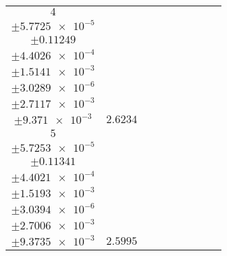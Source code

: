 \documentclass[8pt]{article}
\begin{document}
\begin{longtable}[l]{c c c c c c c c c}
$\num{4}$ & \begin{tabular}[c]{@{}c@{}}$\num{2.9888e-2}$ \\ $\pm\num{5.7725e-5}$\end{tabular} & \begin{tabular}[c]{@{}c@{}}$\num{0.17475}$ \\ $\pm\num{0.11249}$\end{tabular} & \begin{tabular}[c]{@{}c@{}}$\num{-2.9568}$ \\ $\pm\num{4.4026e-4}$\end{tabular} & \begin{tabular}[c]{@{}c@{}}$\num{1.1769e+3}$ \\ $\pm\num{1.5141e-3}$\end{tabular} & \begin{tabular}[c]{@{}c@{}}$\num{2.3544}$ \\ $\pm\num{3.0289e-6}$\end{tabular} & \begin{tabular}[c]{@{}c@{}}$\num{1.1533}$ \\ $\pm\num{2.7117e-3}$\end{tabular} & \begin{tabular}[c]{@{}c@{}}$\num{4.1822}$ \\ $\pm\num{9.371e-3}$\end{tabular} & $\num{2.6234}$\\
$\num{5}$ & \begin{tabular}[c]{@{}c@{}}$\num{2.9531e-2}$ \\ $\pm\num{5.7253e-5}$\end{tabular} & \begin{tabular}[c]{@{}c@{}}$\num{-0.1399}$ \\ $\pm\num{0.11341}$\end{tabular} & \begin{tabular}[c]{@{}c@{}}$\num{2.9564}$ \\ $\pm\num{4.4021e-4}$\end{tabular} & \begin{tabular}[c]{@{}c@{}}$\num{1.1828e+3}$ \\ $\pm\num{1.5193e-3}$\end{tabular} & \begin{tabular}[c]{@{}c@{}}$\num{2.3662}$ \\ $\pm\num{3.0394e-6}$\end{tabular} & \begin{tabular}[c]{@{}c@{}}$\num{1.1422}$ \\ $\pm\num{2.7006e-3}$\end{tabular} & \begin{tabular}[c]{@{}c@{}}$\num{4.1667}$ \\ $\pm\num{9.3735e-3}$\end{tabular} & $\num{2.5995}$\\

\end{longtable}
\end{document}
